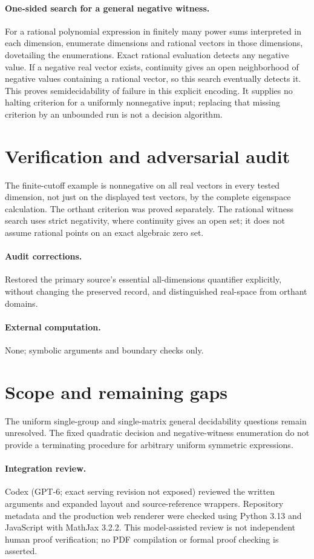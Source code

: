 \documentclass[11pt]{article}
\begin{document}
\paragraph{One-sided search for a general negative witness.}
For a rational polynomial expression in finitely many power sums interpreted in each dimension, enumerate dimensions and rational vectors in those dimensions, dovetailing the enumerations. Exact rational evaluation detects any negative value. If a negative real vector exists, continuity gives an open neighborhood of negative values containing a rational vector, so this search eventually detects it. This proves semidecidability of failure in this explicit encoding. It supplies no halting criterion for a uniformly nonnegative input; replacing that missing criterion by an unbounded run is not a decision algorithm.
\section{Verification and adversarial audit}
The finite-cutoff example is nonnegative on all real vectors in every tested dimension, not just on the displayed test vectors, by the complete eigenspace calculation. The orthant criterion was proved separately. The rational witness search uses strict negativity, where continuity gives an open set; it does not assume rational points on an exact algebraic zero set.
\paragraph{Audit corrections.} Restored the primary source's essential all-dimensions quantifier explicitly, without changing the preserved record, and distinguished real-space from orthant domains.
\paragraph{External computation.} None; symbolic arguments and boundary checks only.
\section{Scope and remaining gaps}
The uniform single-group and single-matrix general decidability questions remain unresolved. The fixed quadratic decision and negative-witness enumeration do not provide a terminating procedure for arbitrary uniform symmetric expressions.
\paragraph{Integration review.} Codex (GPT-6; exact serving revision not exposed) reviewed the written arguments and expanded layout and source-reference wrappers. Repository metadata and the production web renderer were checked using Python 3.13 and JavaScript with MathJax 3.2.2. This model-assisted review is not independent human proof verification; no PDF compilation or formal proof checking is asserted.
\end{document}

